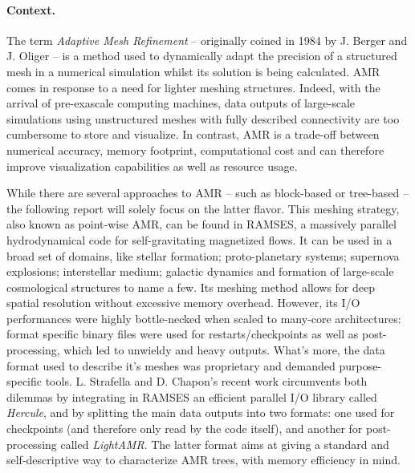 \documentclass[
	a4paper,
	12pt,
	raggedright,
	twoside
]{tufte-style-article}
\theoremstyle{definition}
\theoremstyle{remark}
\begin{document}
\paragraph{Context.}
The term \textit{Adaptive Mesh Refinement} -- originally coined in 1984 by J. Berger and J. Oliger\cite{AMROriginal} -- is a method used to dynamically adapt the precision of a structured mesh in a numerical simulation whilst its solution is being calculated. \Gls{AMR} comes in response to a need for lighter meshing structures. Indeed, with the arrival of pre-exascale computing machines,\cite{tera_computer} data outputs of large-scale simulations using unstructured meshes with fully described connectivity are too cumbersome to store and visualize. In contrast, \Gls{AMR} is a trade-off between numerical accuracy, memory footprint, computational cost and can therefore improve visualization capabilities as well as resource usage.

While there are several approaches to \Gls{AMR} -- such as block-based or tree-based -- the following report will solely focus on the latter flavor. This meshing strategy, also known as point-wise \Gls{AMR}, can be found in RAMSES, a massively parallel hydrodynamical code for self-gravitating magnetized flows. It can be used in a broad set of domains, like stellar formation; proto-planetary systems; supernova explosions; interstellar medium; galactic dynamics and formation of large-scale cosmological structures to name a few.\cite{ramses} Its meshing method allows for deep spatial resolution without excessive memory overhead. However, its I/O performances were highly bottle-necked when scaled to many-core architectures: format specific binary files were used for restarts/checkpoints as well as post-processing, which led to unwieldy and heavy outputs. What's more, the data format used to describe it's meshes was proprietary and demanded purpose-specific tools.\cite{pymses_website, osiris, yt} L. Strafella and D. Chapon's recent work\cite{Strafella_2020} circumvents both dilemmas by integrating in RAMSES an efficient parallel I/O library called \textit{Hercule}, and by splitting the main data outputs into two formats: one used for checkpoints (and therefore only read by the code itself), and another for post-processing called \textit{LightAMR}. The latter format aims at giving a standard and self-descriptive way to characterize \Gls{AMR} trees, with memory efficiency in mind.
\end{document}
